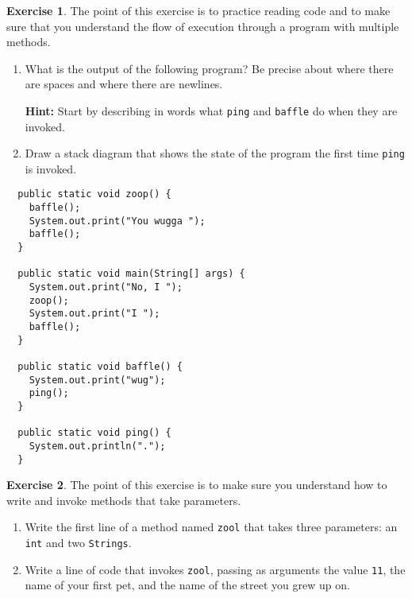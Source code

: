 \documentclass[12pt]{book}
\def\HINT{\textbf{Hint:}}
\theoremstyle{definition}
\newtheorem{excz}{Exercise}[chapter]
\newenvironment{exercise}{\bigskip\begin{excz}\mbox{}}{\end{excz}}
\begin{document}
\begin{exercise}

The point of this exercise is to practice reading code and to
make sure that you understand the flow of execution through
a program with multiple methods.

\begin{enumerate}

\item What is the output of the following program?  Be precise
about where there are spaces and where there are newlines.

\HINT{} Start by describing in words what {\tt ping} and
{\tt baffle} do when they are invoked.

\item Draw a stack diagram that shows the state of the program
the first time {\tt ping} is invoked.

\end{enumerate}

\begin{lstlisting}
  public static void zoop() {
    baffle();    
    System.out.print("You wugga ");
    baffle();
  }

  public static void main(String[] args) {
    System.out.print("No, I ");
    zoop();
    System.out.print("I ");
    baffle();
  }

  public static void baffle() {
    System.out.print("wug");
    ping();
  }

  public static void ping() {
    System.out.println(".");
  }
\end{lstlisting}

\end{exercise}


\begin{exercise}

The point of this exercise is to make sure you understand how
to write and invoke methods that take parameters.

\begin{enumerate}

\item Write the first line of a method named {\tt zool} that
takes three parameters: an {\tt int} and two {\tt Strings}.

\item Write a line of code that invokes {\tt zool}, passing
as arguments the value {\tt 11}, the name of your first pet,
and the name of the street you grew up on.
\end{enumerate}

\end{exercise}
\end{document}
